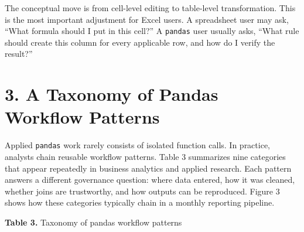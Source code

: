 \documentclass[
  12pt,
]{article}
\begin{document}
The conceptual move is from cell-level editing to table-level
transformation. This is the most important adjustment for Excel users. A
spreadsheet user may ask, ``What formula should I put in this cell?'' A
\texttt{pandas} user usually asks, ``What rule should create this column
for every applicable row, and how do I verify the result?''

\section{3. A Taxonomy of Pandas Workflow
Patterns}\label{a-taxonomy-of-pandas-workflow-patterns}

Applied \texttt{pandas} work rarely consists of isolated function calls.
In practice, analysts chain reusable workflow patterns. Table 3
summarizes nine categories that appear repeatedly in business analytics
and applied research. Each pattern answers a different governance
question: where data entered, how it was cleaned, whether joins are
trustworthy, and how outputs can be reproduced. Figure 3 shows how these
categories typically chain in a monthly reporting pipeline.

\textbf{Table 3.} Taxonomy of pandas workflow patterns
\end{document}
